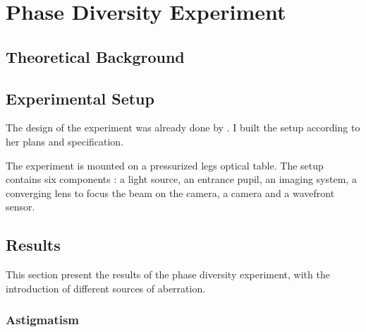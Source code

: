 
\chapter{Phase Diversity Experiment} %

\label{PDExp} %




\section{Theoretical Background}




\section{Experimental Setup}

The design of the experiment was already done by \citet{Bouxin_PDM}. I built the setup according to her plans and specification.

The experiment is mounted on a pressurized legs optical table. The setup contains six components : a light source, an entrance pupil, an imaging system, a converging lens to focus the beam on the camera, a camera and a wavefront sensor.


\section{Results}

This section present the results of the phase diversity experiment, with the introduction of different sources of aberration.

\subsection{Astigmatism}


